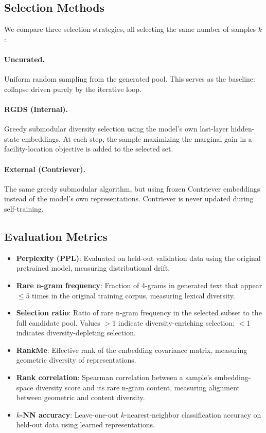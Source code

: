 \documentclass[11pt]{article}
\begin{document}
\subsection{Selection Methods}

We compare three selection strategies, all selecting the same number of samples $k$:

\paragraph{Uncurated.} Uniform random sampling from the generated pool. This serves as the baseline: collapse driven purely by the iterative loop.

\paragraph{RGDS (Internal).} Greedy submodular diversity selection using the model's own last-layer hidden-state embeddings. At each step, the sample maximizing the marginal gain in a facility-location objective is added to the selected set.

\paragraph{External (Contriever).} The same greedy submodular algorithm, but using frozen Contriever \citep{izacard2022contriever} embeddings instead of the model's own representations. Contriever is never updated during self-training.

\subsection{Evaluation Metrics}

\begin{itemize}
    \item \textbf{Perplexity (PPL)}: Evaluated on held-out validation data using the original pretrained model, measuring distributional drift.
    \item \textbf{Rare n-gram frequency}: Fraction of 4-grams in generated text that appear $\leq 5$ times in the original training corpus, measuring lexical diversity.
    \item \textbf{Selection ratio}: Ratio of rare n-gram frequency in the selected subset to the full candidate pool. Values $> 1$ indicate diversity-enriching selection; $< 1$ indicates diversity-depleting selection.
    \item \textbf{RankMe}: Effective rank of the embedding covariance matrix, measuring geometric diversity of representations.
    \item \textbf{Rank correlation}: Spearman correlation between a sample's embedding-space diversity score and its rare n-gram content, measuring alignment between geometric and content diversity.
    \item \textbf{$k$-NN accuracy}: Leave-one-out $k$-nearest-neighbor classification accuracy on held-out data using learned representations.
\end{itemize}
\end{document}
